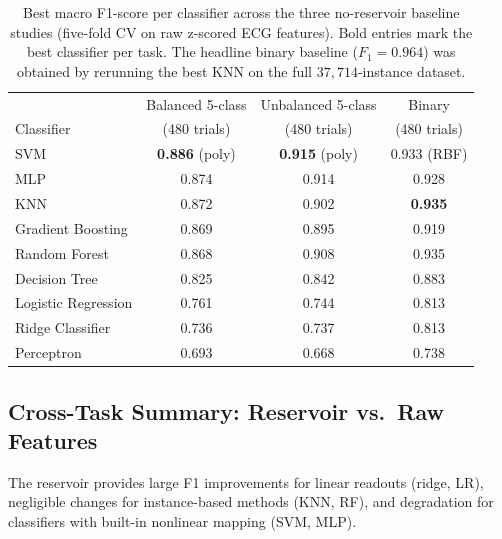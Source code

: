 \documentclass[journal=asbcd6,manuscript=suppinfo]{achemso}
\begin{document}
\begin{table}[H]
    \centering
    \caption{Best macro F1-score per classifier across the three no-reservoir baseline studies (five-fold CV on raw z-scored ECG features). 
    Bold entries mark the best classifier per task. 
    The headline binary baseline ($F_1 = 0.964$) was obtained by rerunning the best KNN on the full $37{,}714$-instance dataset.}
    \label{tab:B1-baseline}\label{tab:B2-baseline}\label{tab:B3-baseline}
    \small
    \begin{tabular}{lccc}
        \toprule
        & Balanced 5-class & Unbalanced 5-class & Binary \\
        Classifier & (480 trials) & (480 trials) & (480 trials) \\
        \midrule
        SVM         & \textbf{0.886} (poly) & \textbf{0.915} (poly) & 0.933 (RBF) \\
        MLP         & 0.874 & 0.914 & 0.928 \\
        KNN         & 0.872 & 0.902 & \textbf{0.935} \\
        Gradient Boosting & 0.869 & 0.895 & 0.919 \\
        Random Forest & 0.868 & 0.908 & 0.935 \\
        Decision Tree & 0.825 & 0.842 & 0.883 \\
        Logistic Regression & 0.761 & 0.744 & 0.813 \\
        Ridge Classifier & 0.736 & 0.737 & 0.813 \\
        Perceptron  & 0.693 & 0.668 & 0.738 \\
        \bottomrule
    \end{tabular}
\end{table}

\subsection{Cross-Task Summary: Reservoir vs.\ Raw Features}

The reservoir provides large F1 improvements for linear readouts (ridge, LR), negligible changes for instance-based methods (KNN, RF), and degradation for classifiers with built-in nonlinear mapping (SVM, MLP).
\end{document}
